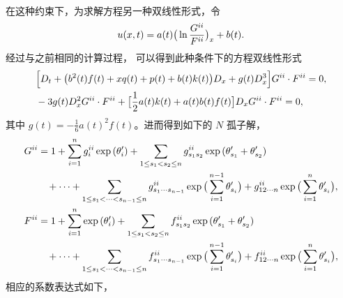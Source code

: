 \vspace{1mm}
\vspace{1mm}\\
在这种约束下，为求解方程另一种双线性形式，令
\begin{equation}
u(x,t) =a(t)\big( \ln{\frac{G^{\uppercase\expandafter{\romannumeral 2}}}{F^{\uppercase\expandafter{\romannumeral 2}}}}  \big)_x +b(t). \label{mkdv-bn11}
\end{equation}
经过与之前相同的计算过程， 可以得到此种条件下的方程双线性形式
\begin{align}
&\Big [ D_t+  \big(b^2(t)f(t)+x q(t) +p(t)+b(t)k(t)\big)D_x +
g(t)D_x^3  \Big ]G^{\uppercase\expandafter{\romannumeral 2}} \cdot F^{\uppercase\expandafter{\romannumeral 2}} =0,\label{mkdv-bn12}\\
 &- 3 g(t) D_x^2 G^{\uppercase\expandafter{\romannumeral 2}} \cdot  F^{\uppercase\expandafter{\romannumeral 2}}  +\big[\frac{1}{2}a(t)k(t)+a(t)b(t)f(t)\big] D_x  G^{\uppercase\expandafter{\romannumeral 2}} \cdot  F^{\uppercase\expandafter{\romannumeral 2}} =0,\label{mkdv-bn13}
\end{align}
其中 $g(t)=-\frac{1}{6} a(t)^2 f(t)$。进而得到如下的 $N$ 孤子解，
\begin{align}
\nonumber
 &G^{\uppercase\expandafter{\romannumeral 2}}=1+  \sum_{i = 1}^{n} g^{\uppercase\expandafter{\romannumeral 2}}_i \exp{(\theta'_i)}
+ \sum_{1 \leq s_1 < s_2 \leq n} g^{\uppercase\expandafter{\romannumeral 2}}_{s_1 s_2}\exp{(\theta'_{s_1}+\theta'_{s_2})}\\
&\quad\quad \,\,+\cdots + \sum_{1 \leq s_1 < \cdots < s_{n-1} \leq n} g^{\uppercase\expandafter{\romannumeral 2}}_{s_1 \cdots s_{n-1}}\exp{\big(\sum_{i = 1}^{n-1} \theta'_{s_i} \big )}
+ g^{\uppercase\expandafter{\romannumeral 2}}_{12 \cdots n}\exp{\big(\sum_{i = 1}^{n} \theta'_{s_i} \big )},
\\
\nonumber
 &F^{\uppercase\expandafter{\romannumeral 2}}=1+  \sum_{i = 1}^{n} \exp{(\theta'_i)}
+ \sum_{1 \leq s_1 < s_2 \leq n} f^{\uppercase\expandafter{\romannumeral 2}}_{s_1 s_2}\exp{(\theta'_{s_1}+\theta'_{s_2})}\\
&\quad\quad\,\, +\cdots + \sum_{1 \leq s_1 < \cdots < s_{n-1} \leq n} f^{\uppercase\expandafter{\romannumeral 2}}_{s_1 \cdots s_{n-1}}\exp{\big(\sum_{i = 1}^{n-1} \theta'_{s_i} \big )}
+ f^{\uppercase\expandafter{\romannumeral 2}}_{12 \cdots n}\exp{\big(\sum_{i = 1}^{n} \theta'_{s_i} \big )},
\end{align}
相应的系数表达式如下，
